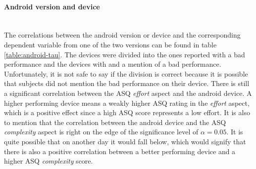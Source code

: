 \begin{table}[htb]
  \caption{Correlation between highest achieved degree and the dependent variables calculated with the \gls{tau}.}
  \label{table:degree-tau}
  \end{table}


\paragraph{Android version and device}\mbox{}\\
The correlations between the \gls{android} version or device and the corresponding dependent variable from one of the two versions can be found in table \ref{table:android-tau}.
The devices were divided into the ones reported with a bad performance and the devices with and a mention of a bad performance.
Unfortunately, it is not safe to say if the division is correct because it is possible that subjects did not mention the bad performance on their device.
There is still a significant correlation between the \gls{ASQ} \textit{effort} aspect and the \gls{android} device.
A higher performing device means a weakly higher ASQ rating in the \textit{effort} aspect, which is a positive effect since a high \gls{ASQ} score represents a low effort.
It is also to mention that the correlation between the \gls{android} device and the \gls{ASQ} \textit{complexity} aspect is right on the edge of the significance level of $\alpha = 0.05$.
It is quite possible that on another day it would fall below, which would signify that there is also a positive correlation between a better performing device and a higher \gls{ASQ} \textit{complexity} score.



